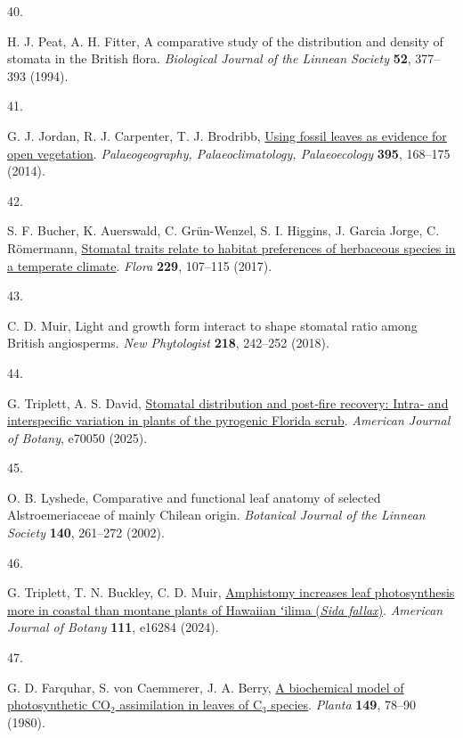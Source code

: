 \documentclass[
  letterpaper,
  DIV=11,
  numbers=noendperiod]{scrartcl}
\newlength{\cslhangindent}
\newlength{\csllabelwidth}
\newenvironment{CSLReferences}[2] %
 {\begin{list}{}{%
  \setlength{\itemindent}{0pt}
  \setlength{\leftmargin}{0pt}
  \setlength{\parsep}{0pt}
  \ifodd #1
   \setlength{\leftmargin}{\cslhangindent}
   \setlength{\itemindent}{-1\cslhangindent}
  \fi
  \setlength{\itemsep}{#2\baselineskip}}}
 {\end{list}}
\newcommand{\CSLLeftMargin}[1]{\parbox[t]{\csllabelwidth}{\strut#1\strut}}
\newcommand{\CSLRightInline}[1]{\parbox[t]{\linewidth - \csllabelwidth}{\strut#1\strut}}
\begin{document}
\begin{CSLReferences}{0}{1}
\CSLLeftMargin{40. }%
\CSLRightInline{H. J. Peat, A. H. Fitter, A comparative study of the
distribution and density of stomata in the {British} flora.
\emph{Biological Journal of the Linnean Society} \textbf{52}, 377--393
(1994).}

\CSLLeftMargin{41. }%
\CSLRightInline{G. J. Jordan, R. J. Carpenter, T. J. Brodribb,
\href{https://doi.org/10.1016/j.palaeo.2013.12.035}{Using fossil leaves
as evidence for open vegetation}. \emph{Palaeogeography,
Palaeoclimatology, Palaeoecology} \textbf{395}, 168--175 (2014).}

\CSLLeftMargin{42. }%
\CSLRightInline{S. F. Bucher, K. Auerswald, C. Grün-Wenzel, S. I.
Higgins, J. Garcia Jorge, C. Römermann,
\href{https://doi.org/10.1016/j.flora.2017.02.011}{Stomatal traits
relate to habitat preferences of herbaceous species in a temperate
climate}. \emph{Flora} \textbf{229}, 107--115 (2017).}

\CSLLeftMargin{43. }%
\CSLRightInline{C. D. Muir, Light and growth form interact to shape
stomatal ratio among {British} angiosperms. \emph{New Phytologist}
\textbf{218}, 242--252 (2018).}

\CSLLeftMargin{44. }%
\CSLRightInline{G. Triplett, A. S. David,
\href{https://doi.org/10.1002/ajb2.70050}{Stomatal distribution and
post‐fire recovery: {Intra}‐ and interspecific variation in plants of
the pyrogenic {Florida} scrub}. \emph{American Journal of Botany},
e70050 (2025).}

\CSLLeftMargin{45. }%
\CSLRightInline{O. B. Lyshede, Comparative and functional leaf anatomy
of selected {Alstroemeriaceae} of mainly {Chilean} origin.
\emph{Botanical Journal of the Linnean Society} \textbf{140}, 261--272
(2002).}

\CSLLeftMargin{46. }%
\CSLRightInline{G. Triplett, T. N. Buckley, C. D. Muir,
\href{https://doi.org/10.1002/ajb2.16284}{Amphistomy increases leaf
photosynthesis more in coastal than montane plants of {Hawaiian} ʻilima
(\emph{{Sida} fallax})}. \emph{American Journal of Botany} \textbf{111},
e16284 (2024).}

\CSLLeftMargin{47. }%
\CSLRightInline{G. D. Farquhar, S. von Caemmerer, J. A. Berry,
\href{https://doi.org/10.1007/BF00386231}{A biochemical model of
photosynthetic {CO}\(_{\textrm{2}}\) assimilation in leaves of
{C}\(_{\textrm{3}}\) species}. \emph{Planta} \textbf{149}, 78--90
(1980).}


\end{CSLReferences}
\end{document}
